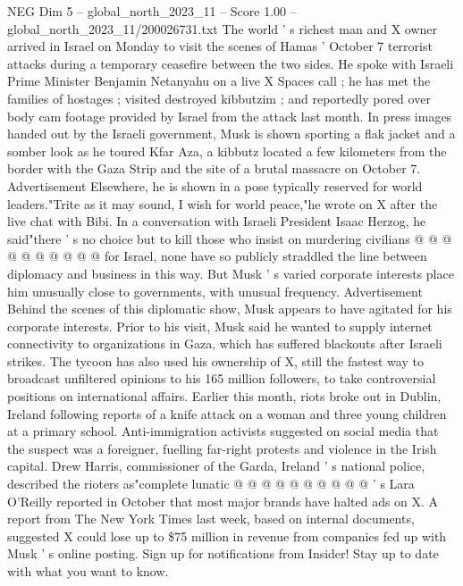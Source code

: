 \begin{textsample}{NEG Dim 5 – global\_north\_2023\_11 – Score 1.00 – global\_north\_2023\_11/200026731.txt}  \label{ex:f5_neg_039}
The world ' s richest man and X owner arrived in Israel on Monday to visit the scenes of Hamas ' October 7 terrorist attacks during a temporary ceasefire between the two sides.
He spoke with Israeli Prime Minister Benjamin Netanyahu on a live X Spaces call ; he has met the families of hostages ; visited destroyed kibbutzim ; and reportedly pored over body cam footage provided by Israel from the attack last month.
In press images handed out by the Israeli government, Musk is shown sporting a flak jacket and a somber look as he toured Kfar Aza, a kibbutz located a few kilometers from the border with the Gaza Strip and the site of a brutal massacre on October 7.
Advertisement Elsewhere, he is shown in a pose typically reserved for world leaders."Trite as it may sound, I wish for world peace,"he wrote on X after the live chat with Bibi.
In a conversation with Israeli President Isaac Herzog, he said"there ' s no choice but to kill those who insist on murdering civilians @ @ @ @ @ @ @ @ @ @ for Israel, none have so publicly straddled the line between diplomacy and business in this way.
But Musk ' s varied corporate interests place him unusually close to governments, with unusual frequency.
Advertisement Behind the scenes of this diplomatic show, Musk appears to have agitated for his corporate interests.
Prior to his visit, Musk said he wanted to supply internet connectivity to organizations in Gaza, which has suffered blackouts after Israeli strikes.
The tycoon has also used his ownership of X, still the fastest way to broadcast unfiltered opinions to his 165 million followers, to take controversial positions on international affairs.
Earlier this month, riots broke out in Dublin, Ireland following reports of a knife attack on a woman and three young children at a primary school.
Anti-immigration activists suggested on social media that the suspect was a foreigner, fuelling far-right protests and violence in the Irish capital.
Drew Harris, commissioner of the Garda, Ireland ' s national police, described the rioters as"complete lunatic @ @ @ @ @ @ @ @ @ @ ' s Lara O'Reilly reported in October that most major brands have halted ads on X.
A report from The New York Times last week, based on internal documents, suggested X could lose up to \$75 million in revenue from companies fed up with Musk ' s online posting.
Sign up for notifications from Insider!
Stay up to date with what you want to know.

\end{textsample}
